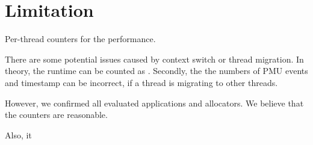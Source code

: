 \section{Limitation}

\label{sec:limitation}

Per-thread counters for the performance. 

There are some potential issues caused by context switch or thread migration. In theory, the runtime can be counted as . Secondly, the the numbers of PMU events and timestamp can be incorrect, if a thread is migrating to other threads. 

However, we confirmed all evaluated applications and allocators. We believe that the counters are reasonable. 

Also, it 